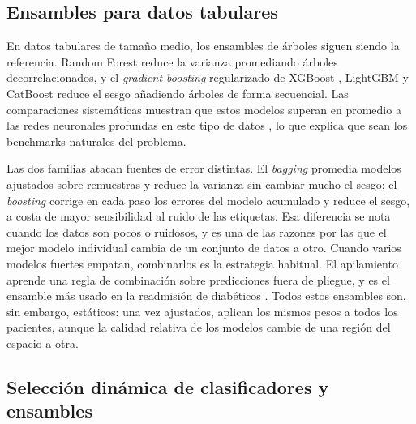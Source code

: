 \documentclass[pdflatex,sn-mathphys-num]{sn-jnl}
\theoremstyle{plain}
\begin{document}
\subsection{Ensambles para datos tabulares}\label{subsec:rel_ensambles}

En datos tabulares de tamaño medio, los ensambles de árboles siguen siendo la referencia. Random Forest \cite{bib_breiman_rf} reduce la varianza promediando árboles decorrelacionados, y el \emph{gradient boosting} regularizado de XGBoost \cite{bib_chen}, LightGBM \cite{bib_ke_2017} y CatBoost \cite{bib_prokhorenkova_2018} reduce el sesgo añadiendo árboles de forma secuencial. Las comparaciones sistemáticas muestran que estos modelos superan en promedio a las redes neuronales profundas en este tipo de datos \cite{bib_grinsztajn_2022}, lo que explica que sean los benchmarks naturales del problema.

Las dos familias atacan fuentes de error distintas. El \emph{bagging} promedia modelos ajustados sobre remuestras y reduce la varianza sin cambiar mucho el sesgo; el \emph{boosting} corrige en cada paso los errores del modelo acumulado y reduce el sesgo, a costa de mayor sensibilidad al ruido de las etiquetas. Esa diferencia se nota cuando los datos son pocos o ruidosos, y es una de las razones por las que el mejor modelo individual cambia de un conjunto de datos a otro. Cuando varios modelos fuertes empatan, combinarlos es la estrategia habitual. El apilamiento \cite{bib_wolpert_1992} aprende una regla de combinación sobre predicciones fuera de pliegue, y es el ensamble más usado en la readmisión de diabéticos \cite{bib_lu_2022, bib_salim_2026}. Todos estos ensambles son, sin embargo, estáticos: una vez ajustados, aplican los mismos pesos a todos los pacientes, aunque la calidad relativa de los modelos cambie de una región del espacio a otra.

\subsection{Selección dinámica de clasificadores y ensambles}\label{subsec:rel_des}
\end{document}
